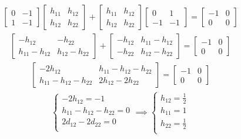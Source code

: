 \documentclass[a4paper,11pt]{article}
\begin{document}
\begin{align*}
\begin{bmatrix}
0 & -1 \\ 
1 & -1
\end{bmatrix}
\begin{bmatrix}
h_{11} & h_{12} \\
h_{12} & h_{22}
\end{bmatrix} 
+
\begin{bmatrix}
h_{11} & h_{12} \\
h_{12} & h_{22}
\end{bmatrix} 
\begin{bmatrix}
0 & 1 \\
-1 & -1
\end{bmatrix}
=
\begin{bmatrix}
-1 & 0 \\
0 & 0
\end{bmatrix}
\end{align*}
\begin{align*}
\begin{bmatrix}
-h_{12} & -h_{22} \\
h_{11}-h_{12} & h_{12}-h_{22}
\end{bmatrix} +
\begin{bmatrix}
-h_{12} & h_{11}-h_{12} \\
-h_{22} & h_{12}-h_{22}
\end{bmatrix} = 
\begin{bmatrix}
-1 & 0 \\
0 & 0
\end{bmatrix} 
\end{align*}
\begin{align*}
\begin{bmatrix}
-2h_{12} & h_{11}-h_{12}-h_{22} \\
h_{11}-h_{12}-h_{22} & 2h_{12}-2h_{22}
\end{bmatrix} =
\begin{bmatrix}
-1 & 0 \\
0 & 0
\end{bmatrix} 
\end{align*}
\begin{align*}
\begin{cases}
-2h_{12} = -1  \\
h_{11}-h_{12}-h_{22} = 0 \\
2d_{12}-2d_{22} = 0 \\
\end{cases}
\implies
\begin{cases}
h_{12} = \frac{1}{2}  \\
h_{11} = 1 \\
h_{22} = \frac{1}{2} \\
\end{cases}
\end{align*}
\end{document}
